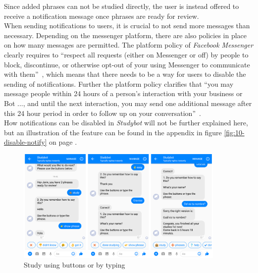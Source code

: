 Since added phrases can not be studied directly,
the user is instead offered to receive a notification message once phrases are ready for review.
\\

When sending notifications to users, it is crucial to not send more messages than necessary.
Depending on the messenger platform, there are also policies in place on how many messages are permitted.
The platform policy of \emph{Facebook Messenger} clearly requires to
``respect all requests (either on Messenger or off) by people to block, discontinue, or otherwise opt-out of your using Messenger to communicate with them''~\cite{fbpolicy},
which means that there needs to be a way for users to disable the sending of notifications.
Further the platform policy clarifies that ``you may message people within 24 hours of a person's interaction with your business or Bot ..., and until the next interaction, you may send one additional message after this 24 hour period in order to follow up on your conversation''~\cite{fbpolicy}.
\\
How notifications can be disabled in \emph{Studybot} will not be further explained here,
but an illustration of the feature can be found in the appendix in figure \ref{fig:10-disable-notify} on page \pageref{fig:10-disable-notify}.
\\

\begin{figure}[h]
  \centering
  \includegraphics[width=0.9\textwidth]{images/interface/08-study-done.png}
	\caption{Study using buttons or by typing}
	\label{fig:08-study-done}
\end{figure}

